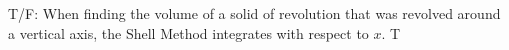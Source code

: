 {T/F: When finding the volume of a solid of revolution that was revolved around a vertical axis, the Shell Method integrates with respect to $x$.}
{T}
